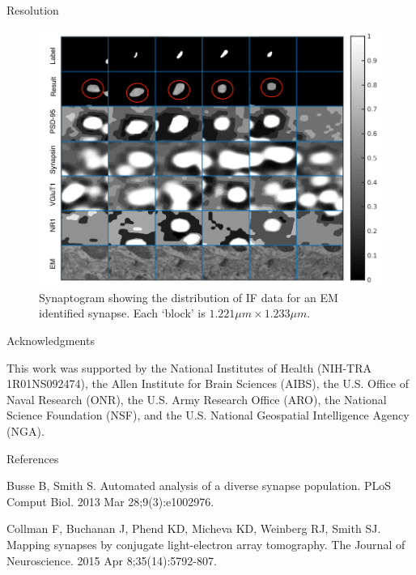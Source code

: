 \documentclass[final, table]{beamer}
\newlength{\onecolwid}
\begin{document}
\begin{frame}[t]
\begin{columns}[t]
\begin{column}{\onecolwid}
\begin{block}{Resolution}
\begin{figure}[!h]
\centering
\includegraphics[width=1\textwidth]{figs/synaptogramSilane}
\caption{Synaptogram showing the distribution of IF data for an EM identified synapse.  Each `block' is $1.221 \mu m \times 1.233 \mu m$. }
\label{fig:synaptogramSilane}
\end{figure}






\end{block} 

\begin{block}{Acknowledgments} 

\tiny{This work was supported by the National Institutes of Health (NIH-TRA 1R01NS092474), the Allen Institute for Brain Sciences (AIBS), the U.S. Office of Naval Research (ONR), the U.S. Army Research Office (ARO), the National Science Foundation (NSF), and the U.S. National Geospatial Intelligence Agency (NGA).}
\end{block} 


\vspace{-0.05in}
\begin{block}{References}
\tiny{
\begin{thebibliography}{99}
Busse B, Smith S. Automated analysis of a diverse synapse population. PLoS Comput Biol. 2013 Mar 28;9(3):e1002976.

Collman F, Buchanan J, Phend KD, Micheva KD, Weinberg RJ, Smith SJ. Mapping synapses by conjugate light-electron array tomography. The Journal of Neuroscience. 2015 Apr 8;35(14):5792-807.
 

\end{thebibliography}}
\end{block}
\end{column}
\end{columns}
\end{frame}
\end{document}
